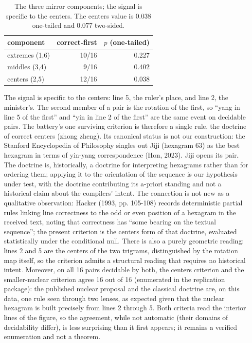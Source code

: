 \documentclass[11pt]{article}
\begin{document}
\begin{table}[t]
\centering
\caption{The three mirror components; the signal is specific to the centers. The centers value is 0.038 one-tailed and 0.077 two-sided.}
\label{tab:centers}
\begin{tabular}{lrr}
\toprule
component & correct-first & $p$ (one-tailed) \\
\midrule
extremes (1,6) & 10/16 & 0.227 \\
middles (3,4)  & 9/16  & 0.402 \\
centers (2,5)  & 12/16 & 0.038 \\
\bottomrule
\end{tabular}
\end{table}

The signal is specific to the centers: line 5, the ruler's place, and line 2, the minister's. The second member of a pair is the rotation of the first, so ``yang in line 5 of the first'' and ``yin in line 2 of the first'' are the same event on decidable pairs. The battery's one surviving criterion is therefore a single rule, the doctrine of correct centers (zhong zheng). Its canonical status is not our construction: the Stanford Encyclopedia of Philosophy singles out Jiji (hexagram 63) as the best hexagram in terms of yin-yang correspondence (Hon, 2023). Jiji opens its pair. The doctrine is, historically, a doctrine for interpreting hexagrams rather than for ordering them; applying it to the orientation of the sequence is our hypothesis under test, with the doctrine contributing its a-priori standing and not a historical claim about the compilers' intent. The connection is not new as a qualitative observation: Hacker (1993, pp. 105-108) records deterministic partial rules linking line correctness to the odd or even position of a hexagram in the received text, noting that correctness has ``some bearing on the textual sequence''; the present criterion is the centers form of that doctrine, evaluated statistically under the conditional null. There is also a purely geometric reading: lines 2 and 5 are the centers of the two trigrams, distinguished by the rotation map itself, so the criterion admits a structural reading that requires no historical intent. Moreover, on all 16 pairs decidable by both, the centers criterion and the smaller-nuclear criterion agree 16 out of 16 (enumerated in the replication package): the published nuclear proposal and the classical doctrine are, on this data, one rule seen through two lenses, as expected given that the nuclear hexagram is built precisely from lines 2 through 5. Both criteria read the interior lines of the figure, so the agreement, while not automatic (their domains of decidability differ), is less surprising than it first appears; it remains a verified enumeration and not a theorem.
\end{document}
